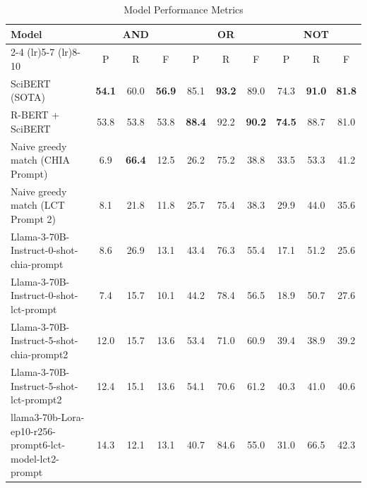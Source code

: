 \begin{table}[h]
\centering
\begin{tabular}{lccccccccc}
\toprule
Model & \multicolumn{3}{c}{AND} & \multicolumn{3}{c}{OR} & \multicolumn{3}{c}{NOT} \\
\cmidrule(lr){2-4} \cmidrule(lr){5-7} \cmidrule(lr){8-10} 
 & P & R & F & P & R & F & P & R & F \\
\midrule
SciBERT (SOTA) & \textbf{54.1} & 60.0 & \textbf{56.9} & 85.1 & \textbf{93.2} & 89.0 & 74.3 & \textbf{91.0} & \textbf{81.8} \\
R-BERT + SciBERT & 53.8 & 53.8 & 53.8 & \textbf{88.4} & 92.2 & \textbf{90.2} & \textbf{74.5} & 88.7 & 81.0 \\
 Naive greedy match (CHIA Prompt) & 6.9 & \textbf{66.4} & 12.5 & 26.2 & 75.2 & 38.8 & 33.5 & 53.3 & 41.2 \\
 Naive greedy match (LCT Prompt 2) & 8.1 & 21.8 & 11.8 & 25.7 & 75.4 & 38.3 & 29.9 & 44.0 & 35.6 \\
Llama-3-70B-Instruct-0-shot-chia-prompt & 8.6 & 26.9 & 13.1 & 43.4 & 76.3 & 55.4 & 17.1 & 51.2 & 25.6 \\
Llama-3-70B-Instruct-0-shot-lct-prompt & 7.4 & 15.7 & 10.1 & 44.2 & 78.4 & 56.5 & 18.9 & 50.7 & 27.6 \\
Llama-3-70B-Instruct-5-shot-chia-prompt2 & 12.0 & 15.7 & 13.6 & 53.4 & 71.0 & 60.9 & 39.4 & 38.9 & 39.2 \\
Llama-3-70B-Instruct-5-shot-lct-prompt2 & 12.4 & 15.1 & 13.6 & 54.1 & 70.6 & 61.2 & 40.3 & 41.0 & 40.6 \\
llama3-70b-Lora-ep10-r256-prompt6-lct-model-lct2-prompt & 14.3 & 12.1 & 13.1 & 40.7 & 84.6 & 55.0 & 31.0 & 66.5 & 42.3 \\
\bottomrule
\end{tabular}
\caption{Model Performance Metrics}
\label{tab:model_metrics}
\end{table}
